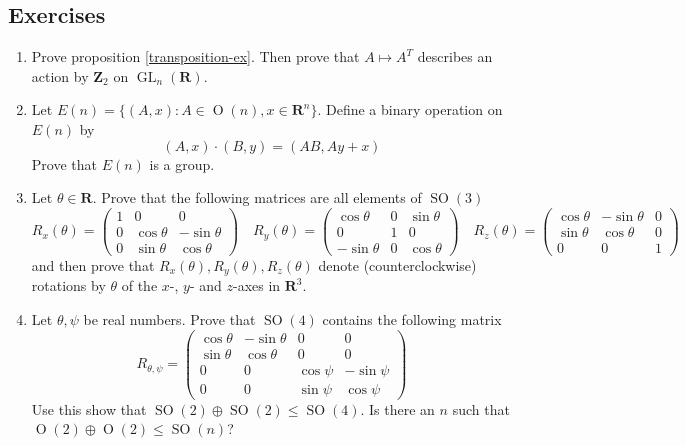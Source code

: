 \documentclass[12pt]{article}
\numberwithin{equation}{subsection}
\theoremstyle{note}
\newcommand{\GL}{\operatorname{GL}}
\newcommand{\Or}{\operatorname{O}}
\newcommand{\SO}{\operatorname{SO}}
\begin{document}
\subsection{Exercises}
\begin{enumerate}[label=\arabic*.]

	\item Prove proposition \ref{transposition-ex}. Then prove that $A\mapsto A^T$ describes an action by $\mathbf{Z}_2$ on $\GL_n(\mathbf{R})$. 
	\item Let $E(n)=\{ (A,x) : A\in \Or(n), x\in \mathbf{R}^n\}$. Define a binary operation on $E(n)$ by \[(A,x)\cdot (B,y)=(AB,Ay+x)\] Prove that $E(n)$ is a group.
	
	\item \label{rotations-R3} Let $\theta\in\mathbf{R}$. Prove that the following matrices are all elements of $\SO(3)$ \[ R_x(\theta)=\begin{pmatrix} 1 & 0 & 0 \\ 0 & \cos\theta & -\sin\theta \\ 0 & \sin\theta & \cos\theta \end{pmatrix} \quad 
	R_y(\theta)=\begin{pmatrix} \cos\theta & 0 &  \sin\theta \\ 0 &1 & 0 \\-\sin\theta & 0 & \cos\theta \end{pmatrix} \quad 
	R_z(\theta)=\begin{pmatrix}  \cos\theta & -\sin\theta& 0 \\ \sin\theta & \cos\theta & 0 \\ 0 & 0 & 1\end{pmatrix}\]
	and then prove that $R_x(\theta),R_y(\theta),R_z(\theta)$ denote (counterclockwise) rotations by $\theta$ of the $x$-, $y$- and $z$-axes in $\mathbf{R}^3$. 
	
	\item Let $\theta,\psi$ be real numbers. Prove that $\SO(4)$ contains the following matrix \[ R_{\theta,\psi} = \begin{pmatrix} \cos \theta & - \sin\theta & 0 & 0 \\
\sin\theta & \cos\theta & 0 & 0 \\
0 & 0 & \cos\psi & -\sin\psi \\
0 & 0 & \sin\psi & \cos\psi\end{pmatrix}\]
Use this show that $\SO(2)\oplus \SO(2)\leq \SO(4)$. Is there an $n$ such that $\Or(2)\oplus \Or(2)\leq \SO(n)$?


\end{enumerate}
\end{document}
